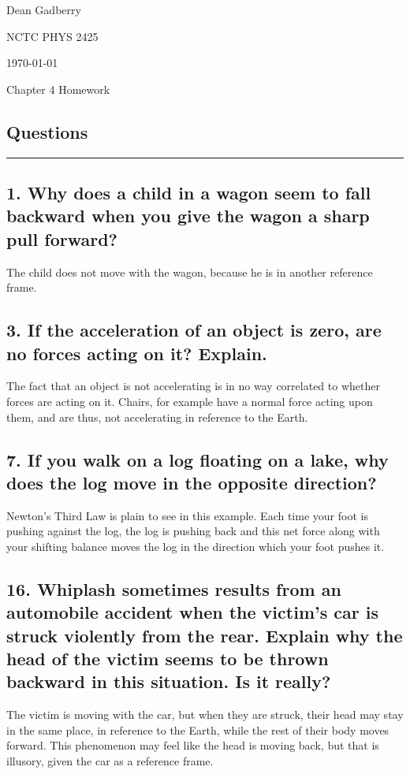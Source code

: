 \documentclass[12pt,a4paper,english]{article}
\begin{document}
\begin{flushright}
  Dean Gadberry

  NCTC PHYS 2425

  \today
\end{flushright}
\begin{center}
  {\large Chapter 4 Homework}
\end{center}
\begin{flushleft}

  \section*{Questions}
  \hrule
  \subsection{1. Why does a child in a wagon seem to fall backward when you give the wagon a sharp pull forward?}
  The child does not move with the wagon, because he is in another reference frame.
  \subsection{3. If the acceleration of an object is zero, are no forces acting on it? Explain.}
  The fact that an object is not accelerating is in no way correlated to whether forces are acting on it. Chairs, for example have a normal force acting upon them, and are thus, not accelerating in reference to the Earth.
  \subsection{7. If you walk on a log floating on a lake, why does the log move in the opposite direction?}
  Newton's Third Law is plain to see in this example. Each time your foot is pushing against the log, the log is pushing back and this net force along with your shifting balance moves the log in the direction which your foot pushes it.
  \subsection{16. Whiplash sometimes results from an automobile accident when the victim's car is struck violently from the rear. Explain why the head of the victim seems to be thrown backward in this situation. Is it really?}
  The victim is moving with the car, but when they are struck, their head may stay in the same place, in reference to the Earth, while the rest of their body moves forward. This phenomenon may feel like the head is moving back, but that is illusory, given the car as a reference frame.

\end{flushleft}
\end{document}
